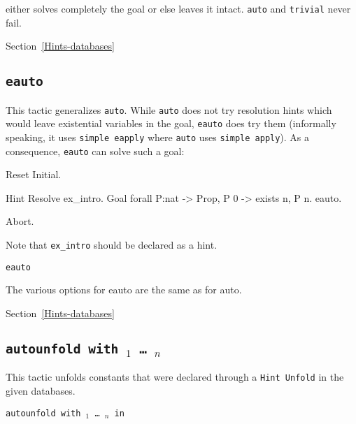 \begin{coq_example*}
 either solves completely the goal or else leaves it
intact. \texttt{auto} and \texttt{trivial} never fail.

\SeeAlso Section~\ref{Hints-databases}

\subsection{\tt eauto}
\label{eauto}

This tactic generalizes {\tt auto}. While {\tt auto} does not try
resolution hints which would leave existential variables in the goal,
{\tt eauto} does try them (informally speaking, it uses
{\tt simple eapply} where {\tt auto} uses {\tt simple apply}).
As a consequence, {\tt eauto} can solve such a goal:

\begin{coq_eval}
Reset Initial.
\end{coq_eval}
\begin{coq_example}
Hint Resolve ex_intro.
Goal forall P:nat -> Prop, P 0 ->  exists n, P n.
eauto.
\end{coq_example}
\begin{coq_eval}
Abort.
\end{coq_eval}

Note that {\tt ex\_intro} should be declared as a hint.

\begin{Variants}

\item {\tt {}eauto \zeroone{\num}}  

  The various options for eauto are the same as for auto.

\end{Variants}

\SeeAlso Section~\ref{Hints-databases}

\subsection{\tt autounfold with \ident$_1$ \mbox{\dots} \ident$_n$}
\label{autounfold}

This tactic unfolds constants that were declared through a {\tt Hint
  Unfold} in the given databases.

\begin{Variants}
\item {\tt autounfold with \ident$_1$ \dots\ \ident$_n$ in }


\end{Variants}
\end{coq_example*}
